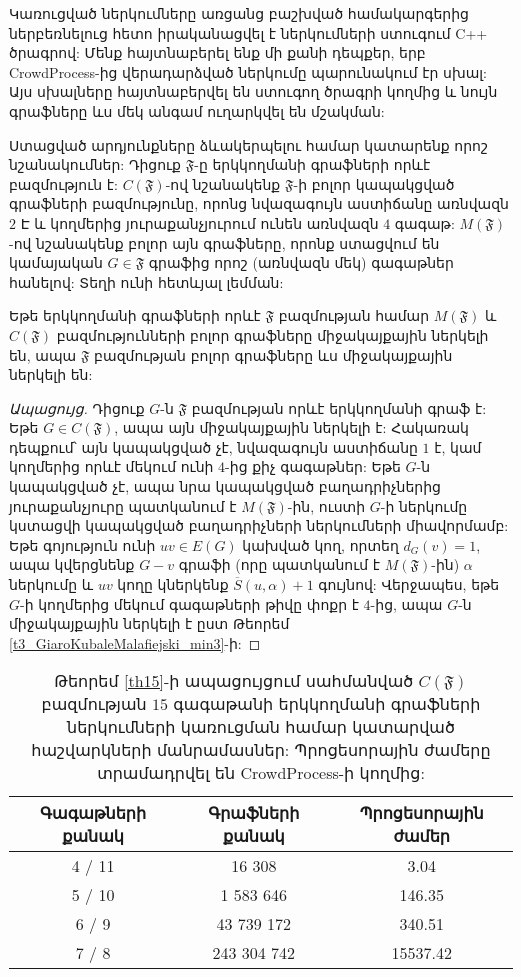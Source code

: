 Կառուցված ներկումները առցանց բաշխված համակարգերից  ներբեռնելուց հետո իրականացվել է ներկումների ստուգում C++ ծրագրով: Մենք հայտնաբերել ենք մի քանի դեպքեր, երբ CrowdProcess-ից վերադարձված ներկումը պարունակում էր սխալ: Այս սխալները հայտնաբերվել են ստուգող ծրագրի կողմից և նույն գրաֆները ևս մեկ անգամ ուղարկվել են մշակման: 

Ստացված արդյունքները ձևակերպելու համար կատարենք որոշ նշանակումներ: Դիցուք $\mathfrak{F}$-ը երկկողմանի գրաֆների որևէ բազմություն է: $C(\mathfrak{F})$-ով նշանակենք $\mathfrak{F}$-ի բոլոր կապակցված գրաֆների բազմությունը, որոնց նվազագույն աստիճանը առնվազն $2$ Է և կողմերից յուրաքանչյուրում ունեն առնվազն $4$ գագաթ: $M(\mathfrak{F})$-ով նշանակենք բոլոր այն գրաֆները, որոնք ստացվում են կամայական $G \in \mathfrak{F}$ գրաֆից որոշ (առնվազն մեկ) գագաթներ հանելով: Տեղի ունի հետևյալ լեմման:

\begin{lemma}
\label{mainLemma}
Եթե երկկողմանի գրաֆների որևէ $\mathfrak{F}$ բազմության համար $M(\mathfrak{F})$ և $C(\mathfrak{F})$ բազմությունների բոլոր գրաֆները միջակայքային ներկելի են, ապա $\mathfrak{F}$ բազմության բոլոր գրաֆները ևս միջակայքային ներկելի են:
\end{lemma}
\begin{proof}[Ապացույց]
Դիցուք $G$-ն $\mathfrak{F}$ բազմության որևէ երկկողմանի գրաֆ է: Եթե $G \in C(\mathfrak{F})$, ապա այն միջակայքային ներկելի է: Հակառակ դեպքում՝ այն կապակցված չէ, նվազագույն աստիճանը $1$ է, կամ կողմերից որևէ մեկում ունի $4$-ից քիչ գագաթներ: Եթե $G$-ն կապակցված չէ, ապա նրա կապակցված բաղադրիչներից յուրաքանչյուրը պատկանում է $M(\mathfrak{F})$-ին, ուստի $G$-ի ներկումը կստացվի կապակցված բաղադրիչների ներկումների միավորմամբ: Եթե գոյություն ունի $uv \in E(G)$ կախված կող, որտեղ $d_G(v)=1$, ապա կվերցնենք $G-v$ գրաֆի (որը պատկանում է $M(\mathfrak{F})$-ին) $\alpha$ ներկումը և $uv$ կողը կներկենք $\overline{S}(u,\alpha) + 1$ գույնով: Վերջապես, եթե $G$-ի կողմերից մեկում գագաթների թիվը փոքր է $4$-ից, ապա $G$-ն միջակայքային ներկելի է ըստ Թեորեմ \ref{t3_GiaroKubaleMalafiejski_min3}-ի:
\end{proof}
\begin{table}[t]
\renewcommand{\arraystretch}{1.2}
\begin{center}
\begin{tabular}{|c|c|c|}
\hline
Գագաթների քանակ & Գրաֆների քանակ & Պրոցեսորային ժամեր \\
\hline
4 / 11 & 16 308 & 3.04 \\
\hline
5 / 10 & 1 583 646 & 146.35 \\
\hline
6 / 9 & 43 739 172 & 340.51\\
\hline
7 / 8 & 243 304 742 & 15537.42\\
\hline
\end{tabular}
\end{center}
\caption{Թեորեմ \ref{th15}-ի ապացույցում սահմանված $C(\mathfrak{F})$ բազմության $15$ գագաթանի երկկողմանի գրաֆների ներկումների կառուցման համար կատարված հաշվարկների մանրամասներ: Պրոցեսորային ժամերը տրամադրվել են CrowdProcess-ի կողմից:}
\label{table15}
\end{table}

